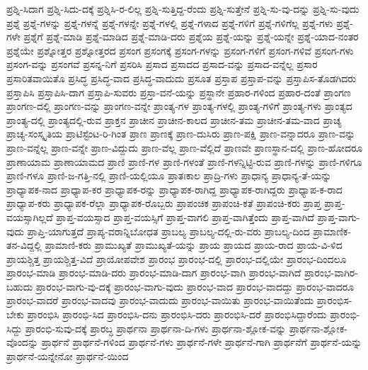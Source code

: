 {ಪ್ರಶ್ನಿ-ಸಿದಾಗ
ಪ್ರಶ್ನಿ-ಸಿದು-ದಕ್ಕೆ
ಪ್ರಶ್ನಿಸಿ-ರ-ಲಿಲ್ಲ
ಪ್ರಶ್ನಿ-ಸುತ್ತಿದ್ದ-ರೆಂದು
ಪ್ರಶ್ನಿ-ಸುತ್ತೇನೆ
ಪ್ರಶ್ನಿ-ಸು-ವು-ದನ್ನು
ಪ್ರಶ್ನಿ-ಸು-ವುದು
ಪ್ರಶ್ನೆ
ಪ್ರಶ್ನೆ-ಗಳನ್ನು
ಪ್ರಶ್ನೆ-ಗಳನ್ನೆ
ಪ್ರಶ್ನೆ-ಗಳನ್ನೇ
ಪ್ರಶ್ನೆ-ಗಳಲ್ಲಿ
ಪ್ರಶ್ನೆ-ಗಳಾದ
ಪ್ರಶ್ನೆ-ಗಳಿಗೆ
ಪ್ರಶ್ನೆ-ಗಳಿಗೆಲ್ಲ
ಪ್ರಶ್ನೆ-ಗಳು
ಪ್ರಶ್ನೆ-ಗಳೇ
ಪ್ರಶ್ನೆಗೆ
ಪ್ರಶ್ನೆ-ಮಾಡಿ
ಪ್ರಶ್ನೆ-ಮಾಡಿದ
ಪ್ರಶ್ನೆ-ಮಾಡಿ-ದರು
ಪ್ರಶ್ನೆಯ
ಪ್ರಶ್ನೆ-ಯನ್ನು
ಪ್ರಶ್ನೆ-ಯನ್ನೇ
ಪ್ರಶ್ನೆ-ಯಾದ-ನಂತರ
ಪ್ರಶ್ನೆಯೇ
ಪ್ರಶ್ನೋತ್ತರ
ಪ್ರಶ್ನೋತ್ತರದ
ಪ್ರಸಂಗ
ಪ್ರಸಂಗಕ್ಕೆ
ಪ್ರಸಂಗ-ಗಳನ್ನು
ಪ್ರಸಂಗ-ಗಳಿಗೆ
ಪ್ರಸಂಗ-ಗಳಿವೆ
ಪ್ರಸಂಗ-ಗಳು
ಪ್ರಸಂಗ-ವನ್ನು
ಪ್ರಸಂಗವೆ
ಪ್ರಸನ್ನ-ನಿಗೆ
ಪ್ರಸರಿಸಿ
ಪ್ರಸಾದ
ಪ್ರಸಾದದ
ಪ್ರಸಾದ-ವನ್ನು
ಪ್ರಸಾದ-ವನ್ನೆಲ್ಲ
ಪ್ರಸಾರ
ಪ್ರಸಾರಿತವಾಯಿತೊ
ಪ್ರಸಿದ್ಧ
ಪ್ರಸಿದ್ಧ-ವಾದ
ಪ್ರಸಿದ್ಧ-ವಾದುದು
ಪ್ರಸೂತ
ಪ್ರಸ್ತಾಪ
ಪ್ರಸ್ತಾಪ-ವನ್ನು
ಪ್ರಸ್ತಾಪಿಸ-ತೊಡಗಿದರು
ಪ್ರಸ್ತಾಪಿಸಿ
ಪ್ರಸ್ತಾಪಿಸಿ-ದಾಗ
ಪ್ರಸ್ತಾಪಿ-ಸುವರು
ಪ್ರಸ್ತಾ-ವನೆ-ಯನ್ನು
ಪ್ರಸ್ಥಾನೇ
ಪ್ರಹಾರ-ಗಳಿಂದ
ಪ್ರಹಾರ-ದಂತೆ
ಪ್ರಾಂಗಣ
ಪ್ರಾಂಗಣ-ದಲ್ಲಿ
ಪ್ರಾಂಗಣ-ವನ್ನು
ಪ್ರಾಂಗಣ-ವನ್ನೇ
ಪ್ರಾಂತ್ಯ-ಗಳ
ಪ್ರಾಂತ್ಯ-ಗಳಲ್ಲಿ
ಪ್ರಾಂತ್ಯ-ಗಳಿಗೆ
ಪ್ರಾಂತ್ಯ-ಗಳು
ಪ್ರಾಂತ್ಯದ
ಪ್ರಾಂತ್ಯ-ದಲ್ಲಿ
ಪ್ರಾಂತ್ಯದಲ್ಲಿ-ರುವ
ಪ್ರಾಕ್ತನ
ಪ್ರಾಚೀನ
ಪ್ರಾಚೀನ-ಕಾಲದ
ಪ್ರಾಚೀನ-ತಮ
ಪ್ರಾಚೀನ-ತಮ-ವಾದ
ಪ್ರಾಚ್ಯ
ಪ್ರಾಚ್ಯ-ಸಂಸ್ಕೃತಿಯ
ಪ್ರಾಟಿಸ್ಟೆಂಟ-ರಿ-ಗಿಂತ
ಪ್ರಾಣ
ಪ್ರಾಣಕ್ಕೆ
ಪ್ರಾಣ-ದುಸಿರು
ಪ್ರಾಣ-ಪಕ್ಷಿ
ಪ್ರಾಣ-ವನ್ನಾದರೂ
ಪ್ರಾಣ-ವನ್ನು
ಪ್ರಾಣ-ವನ್ನೆಲ್ಲ
ಪ್ರಾಣ-ವನ್ನೇ
ಪ್ರಾಣ-ವಿದ್ದುದು
ಪ್ರಾಣ-ವೆಲ್ಲ
ಪ್ರಾಣ-ವೆಲ್ಲಿದೆ
ಪ್ರಾಣವೇ
ಪ್ರಾಣಸ್ಥಾನ-ದಲ್ಲಿ
ಪ್ರಾಣ-ಹೋದರೂ
ಪ್ರಾಣಾಯಾಮ
ಪ್ರಾಣಾಯಾಮದ
ಪ್ರಾಣಿ
ಪ್ರಾಣಿ-ಗಳ
ಪ್ರಾಣಿ-ಗಳಂತೆ
ಪ್ರಾಣಿ-ಗಳನ್ನಿಟ್ಟಿ-ರುವ
ಪ್ರಾಣಿ-ಗಳನ್ನು
ಪ್ರಾಣಿ-ಗಳಿಗೂ
ಪ್ರಾಣಿ-ಗಳೂ
ಪ್ರಾಣಿ-ಜ-ಗತ್ತಿ-ನಲ್ಲಿ
ಪ್ರಾಣಿ-ಯಲ್ಲಿಯೂ
ಪ್ರಾತಃಕಾಲ
ಪ್ರಾದ್ರಿ-ಗಳು
ಪ್ರಾಧಾನ್ಯ
ಪ್ರಾಧಾನ್ಯ-ತೆ-ಯನ್ನು
ಪ್ರಾಧ್ಯಾಪಕ-ನಾದ
ಪ್ರಾಧ್ಯಾಪ-ಕರ
ಪ್ರಾಧ್ಯಾಪಕ-ರನ್ನು
ಪ್ರಾಧ್ಯಾಪಕ-ರಾಗಿದ್ದ
ಪ್ರಾಧ್ಯಾಪಕ-ರಾಗಿದ್ದರು
ಪ್ರಾಧ್ಯಾಪ-ಕ-ರಾದ
ಪ್ರಾಧ್ಯಾಪ-ಕರು
ಪ್ರಾಧ್ಯಾಪಕ-ರೆಲ್ಲಾ
ಪ್ರಾಧ್ಯಾಪಕ-ರೊಬ್ಬರು
ಪ್ರಾಪಂಚಿಕ
ಪ್ರಾಪಂಚಿ-ಕತೆ
ಪ್ರಾಪಂಚಿ-ಕರು
ಪ್ರಾಪ್ತ
ಪ್ರಾಪ್ತ-ವಯಸ್ಸಾಗಿಲ್ಲದೆ
ಪ್ರಾಪ್ತ-ವಯಸ್ಸಾದ
ಪ್ರಾಪ್ತ-ವಯಸ್ಸಿಗೆ
ಪ್ರಾಪ್ತ-ವಾಗಲಿ
ಪ್ರಾಪ್ತ-ವಾಗಿತ್ತೆಂದು
ಪ್ರಾಪ್ತ-ವಾಗಿದೆ
ಪ್ರಾಪ್ತ-ವಾಗು-ವುದು
ಪ್ರಾಪ್ತಿ-ಯಾಗುತ್ತದೆ
ಪ್ರಾಪ್ಯ-ವರಾನ್ನಿಬೋಧತ
ಪ್ರಾಬಲ್ಯ
ಪ್ರಾಬಲ್ಯ-ದಲ್ಲಿ-ರು-ವರು
ಪ್ರಾಬಲ್ಯ-ದಿಂದ
ಪ್ರಾಮಾಣಿಕ-ತನ-ವಿದ್ದಲ್ಲಿ
ಪ್ರಾಮಾಣಿ-ಕರು
ಪ್ರಾಮುಖ್ಯತೆ
ಪ್ರಾಮುಖ್ಯತೆ-ಯನ್ನು
ಪ್ರಾಯ
ಪ್ರಾಯದ
ಪ್ರಾಯ-ರಾದ
ಪ್ರಾಯ-ವಿ-ಳಿದ
ಪ್ರಾಯಶ್ಚಿತ್ತ
ಪ್ರಾಯಶ್ಚಿತ್ತ-ವಿದೆ
ಪ್ರಾಯೋಪವೇಶ
ಪ್ರಾರಂಭ
ಪ್ರಾರಂಭ-ದಲ್ಲಿ
ಪ್ರಾರಂಭ-ದಲ್ಲಿಯೇ
ಪ್ರಾರಂಭ-ದಿಂದಲೂ
ಪ್ರಾರಂಭ-ಮಾಡಿ
ಪ್ರಾರಂಭ-ಮಾಡಿ-ದರು
ಪ್ರಾರಂಭ-ಮಾಡಿ-ದಾಗ
ಪ್ರಾರಂಭ-ವಾಗಿ
ಪ್ರಾರಂಭ-ವಾಗಿದೆ
ಪ್ರಾರಂಭ-ವಾಗಿರ-ಬಹುದು
ಪ್ರಾರಂಭ-ವಾಗು-ವು-ದಕ್ಕೆ
ಪ್ರಾರಂಭ-ವಾಗು-ವುದು
ಪ್ರಾರಂಭ-ವಾದ
ಪ್ರಾರಂಭ-ವಾದದ್ದು
ಪ್ರಾರಂಭ-ವಾದರೂ
ಪ್ರಾರಂಭ-ವಾದರೆ
ಪ್ರಾರಂಭ-ವಾದವು
ಪ್ರಾರಂಭ-ವಾದುದು
ಪ್ರಾರಂಭ-ವಾಯಿತು
ಪ್ರಾರಂಭ-ವಾಯಿತೆಂದು
ಪ್ರಾರಂಭಿಸ-ಬೇಕು
ಪ್ರಾರಂಭಿಸಿ
ಪ್ರಾರಂಭಿ-ಸಿದ
ಪ್ರಾರಂಭಿಸಿ-ದನು
ಪ್ರಾರಂಭಿಸಿ-ದರು
ಪ್ರಾರಂಭಿಸಿ-ದರೆ
ಪ್ರಾರಂಭಿಸಿದ್ದಾರೆಂದು
ಪ್ರಾರಂಭಿ-ಸಿದ್ದು
ಪ್ರಾರಂಭಿ-ಸುವು-ದಕ್ಕೆ
ಪ್ರಾರಬ್ಧ
ಪ್ರಾರ್ಥನಾ
ಪ್ರಾರ್ಥನಾ-ದಿ-ಗಳು
ಪ್ರಾರ್ಥನಾ-ಶ್ಲೋಕ-ವನ್ನು
ಪ್ರಾರ್ಥನಾ-ಶ್ಲೋಕ-ವೊಂದನ್ನು
ಪ್ರಾರ್ಥನೆ
ಪ್ರಾರ್ಥನೆ-ಗಳಿಂದ
ಪ್ರಾರ್ಥನೆ-ಗಳು
ಪ್ರಾರ್ಥನೆ-ಗಳೇ
ಪ್ರಾರ್ಥನೆ-ಗಾಗಿ
ಪ್ರಾರ್ಥನೆಗೆ
ಪ್ರಾರ್ಥನೆ-ಯನ್ನು
ಪ್ರಾರ್ಥನೆ-ಯನ್ನೇನೋ
ಪ್ರಾರ್ಥನೆ-ಯಿಂದ
}
